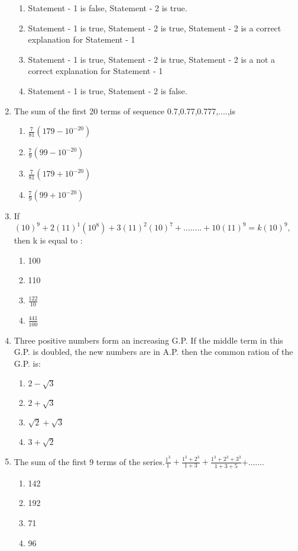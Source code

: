 \begin{enumerate}[label=\arabic*.,ref=\thesubsection.\theenumi]
\begin{enumerate}
\item Statement - 1 is false, Statement - 2 is true.
\item Statement - 1 is true, Statement - 2 is true, Statement - 2 is a correct explanation for Statement - 1
\item Statement - 1 is true, Statement - 2 is true, Statement - 2 is a not a correct explanation for Statement - 1
\item Statement - 1 is true, Statement - 2 is false.
\end{enumerate}
\item The sum of the first 20 terms of sequence 0.7,0.77,0.777,....,is
\begin{enumerate}
\item $\frac{7}{81}(179-10^{-20})$
\item $\frac{7}{9}(99-10^{-20})$
\item $\frac{7}{81}(179+10^{-20})$
\item $\frac{7}{9}(99+10^{-20})$
\end{enumerate}
\item If $(10)^9+2(11)^1(10^8)+3(11)^2(10)^7+........+10(11)^9=k(10)^9,$ then k is equal to :
\begin{enumerate}
\item 100
\item 110
\item $\frac{122}{10}$
\item $\frac{441}{100}$
\end{enumerate}
\item Three positive numbers form an increasing G.P. If the middle term in this G.P. is doubled, the new numbers are in A.P. then the common ration of the G.P. is:
\begin{enumerate}
\item $2-\sqrt{3}$
\item $2+\sqrt{3}$
\item $\sqrt{2}+\sqrt{3}$
\item $3+\sqrt{2}$
\end{enumerate}
\item The sum of the first 9 terms of the series.$\frac{1^3}{1}+\frac{1^3+2^3}{1+3}+\frac{1^3+2^3+3^3}{1+3+5}$+.......
\begin{enumerate}
\item 142
\item 192
\item 71
\item 96
\end{enumerate}

\end{enumerate}
